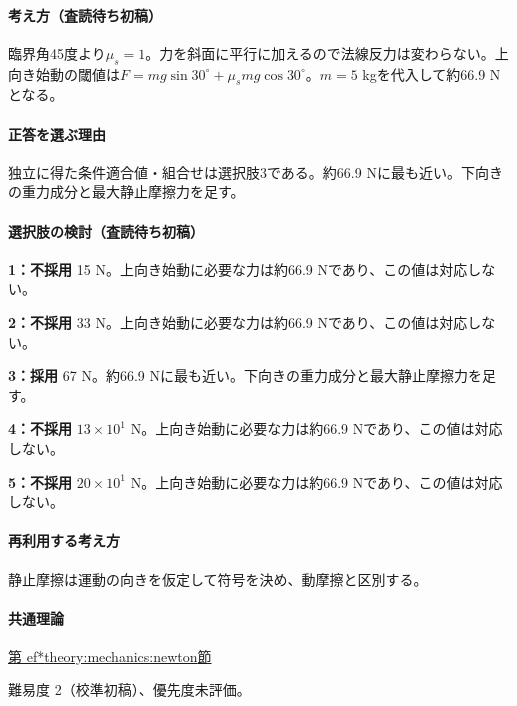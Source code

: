 \paragraph{考え方（査読待ち初稿）} 臨界角45度より\(\mu_s=1\)。力を斜面に平行に加えるので法線反力は変わらない。上向き始動の閾値は\(F=mg\sin30^\circ+\mu_smg\cos30^\circ\)。\(m=5\) kgを代入して約66.9 Nとなる。

\paragraph{正答を選ぶ理由} 独立に得た条件適合値・組合せは選択肢3である。約66.9 Nに最も近い。下向きの重力成分と最大静止摩擦力を足す。

\paragraph{選択肢の検討（査読待ち初稿）}

\noindent\textbf{1：不採用} 15 N。上向き始動に必要な力は約66.9 Nであり、この値は対応しない。\par

\noindent\textbf{2：不採用} 33 N。上向き始動に必要な力は約66.9 Nであり、この値は対応しない。\par

\noindent\textbf{3：採用} 67 N。約66.9 Nに最も近い。下向きの重力成分と最大静止摩擦力を足す。\par

\noindent\textbf{4：不採用} \(13\times10^1\) N。上向き始動に必要な力は約66.9 Nであり、この値は対応しない。\par

\noindent\textbf{5：不採用} \(20\times10^1\) N。上向き始動に必要な力は約66.9 Nであり、この値は対応しない。\par

\paragraph{再利用する考え方} 静止摩擦は運動の向きを仮定して符号を決め、動摩擦と区別する。

\paragraph{共通理論} \hyperref[theory:mechanics:newton]{第
ef*{theory:mechanics:newton}節}

\par 難易度 2（校準初稿）、優先度未評価。

